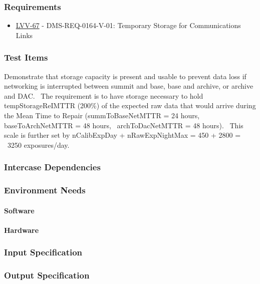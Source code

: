 \subsubsection{Requirements}
\begin{itemize}
\item \href{https://jira.lsstcorp.org/browse/LVV-67}{LVV-67} - DMS-REQ-0164-V-01: Temporary Storage for Communications Links
\end{itemize}

\subsubsection{Test Items}
Demonstrate that storage capacity is present and usable to prevent data
loss if networking is interrupted between summit and base, base and
archive, or archive and DAC. ~The requirement is to have storage
necessary to hold tempStorageReIMTTR (200\%) of the expected raw data
that would arrive during the Mean Time to Repair (summToBaseNetMTTR = 24
hours, baseToArchNetMTTR = 48 hours, ~archToDacNetMTTR = 48 hours).
~This scale is further set by nCalibExpDay + nRawExpNightMax = 450 +
2800 = ~3250 exposures/day.



\subsubsection{Intercase Dependencies}

\subsubsection{Environment Needs}

\paragraph{Software}

\paragraph{Hardware}

\subsubsection{Input Specification}

\subsubsection{Output Specification}

